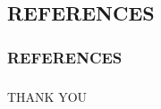 \documentclass[12pt]{beamer}
\begin{document}
	\begin{frame}
 \section{REFERENCES}
		\frametitle{REFERENCES}
 
 
 \end{frame}
	
	\begin{frame}
		\frametitle{}
		
  \centering\Large{ THANK YOU}
		
		
		
	\end{frame}
\end{document}

